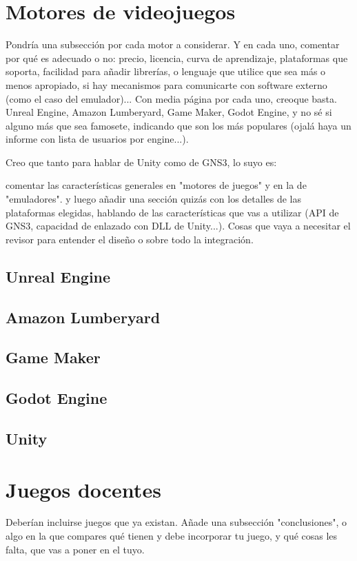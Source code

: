 \section{Motores de videojuegos}
Pondría una subsección por cada motor a considerar. Y en cada uno, comentar por qué es adecuado o no: precio, licencia, curva de aprendizaje, plataformas que soporta, facilidad para añadir librerías, o lenguaje que utilice que sea más o menos apropiado, si hay mecanismos para comunicarte con software externo (como el caso del emulador)... Con media página por cada uno, creoque basta. Unreal Engine, Amazon Lumberyard, Game Maker, Godot Engine, y no sé si alguno más que sea famosete, indicando que son los más populares (ojalá haya un informe con lista de usuarios por engine...).

Creo que tanto para hablar de Unity como de GNS3, lo suyo es:

comentar las características generales en "motores de juegos" y en la de "emuladores". y luego añadir una sección quizás con los detalles de las plataformas elegidas, hablando de las características que vas a utilizar (API de GNS3, capacidad de enlazado con DLL de Unity...). Cosas que vaya a necesitar el revisor para entender el diseño o sobre todo la integración.

\subsection{Unreal Engine}

\subsection{Amazon Lumberyard}

\subsection{Game Maker}

\subsection{Godot Engine}

\subsection{Unity}

\section{Juegos docentes}
Deberían incluirse juegos que ya existan. Añade una subsección "conclusiones", o algo en la que compares qué tienen y debe incorporar tu juego, y qué cosas les falta, que vas a poner en el tuyo.